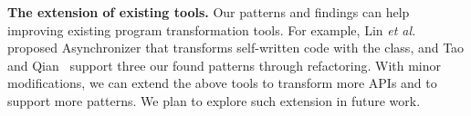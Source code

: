 \noindent
\textbf{The extension of existing tools.} Our patterns and findings can help improving existing program transformation tools. For example,  Lin \emph{et al.}~\cite{conf/sigsoft/LinRD14} proposed Asynchronizer that transforms self-written code with the  class, and Tao and Qian~\cite{tao2014refactoring} support three our found patterns through refactoring. With minor modifications, we can extend the above tools to transform more APIs and to support more patterns. We plan to explore such extension in future work.

